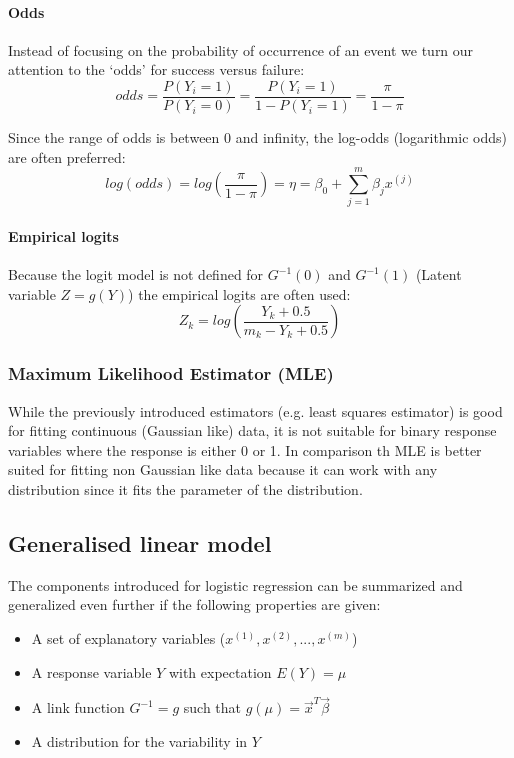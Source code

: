 \paragraph{Odds}
Instead of focusing on the probability of occurrence of an event we turn our attention to the ‘odds’ for success versus failure:
\begin{equation*}
odds = \frac{P(Y_i=1)}{P(Y_i=0)} = \frac{P(Y_i=1)}{1 - P(Y_i=1)} = \frac{\pi}{1-\pi}
\end{equation*}

Since the range of odds is between 0 and infinity, the log-odds (logarithmic odds) are often preferred:
\begin{equation*}
log(odds) = log(\frac{\pi}{1-\pi}) = \eta = \beta_0 + \sum_{j=1}^{m} \beta_j x^{(j)}
\end{equation*}

\paragraph{Empirical logits}

Because the logit model is not defined for $G^{-1}(0)$ and $G^{-1}(1)$ (Latent variable $Z = g(Y)$) the empirical logits are often used:
\begin{equation*}
Z_k = log(\frac{Y_k + 0.5}{m_k-Y_k+0.5})
\end{equation*}

\subsubsection{Maximum Likelihood Estimator (MLE)}

While the previously introduced estimators (e.g. least squares estimator) is good for fitting continuous (Gaussian like) data, it is not suitable for binary response variables where the response is either 0 or 1. In comparison th MLE is better suited for fitting non Gaussian like data because it can work with any distribution since it fits the parameter of the distribution.

\subsection{Generalised linear model}

The components introduced for logistic regression can be summarized and generalized even further if the following properties are given:

\begin{itemize}
	\tightlist
	\item A set of explanatory variables ($x^{(1)}, x^{(2)}, ..., x^{(m)}$)
	\item A response variable $Y$ with expectation $E(Y)=\mu$
	\item A link function $G^{-1} = g$ such that $g(\mu) = \vec{x}^T \vec{\beta}$
	\item A distribution for the variability in $Y$
\end{itemize}

